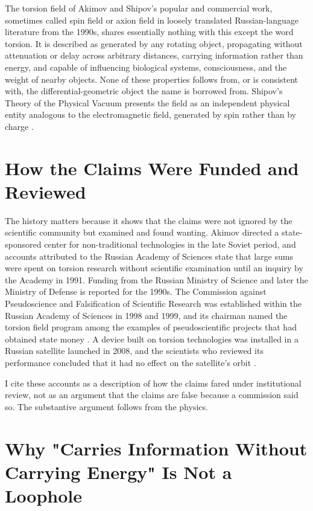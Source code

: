 \documentclass[11pt]{article}
\begin{document}
The torsion field of Akimov and Shipov's popular and commercial work, sometimes called spin field or axion field in loosely translated Russian-language literature from the 1990s, shares essentially nothing with this except the word torsion. It is described as generated by any rotating object, propagating without attenuation or delay across arbitrary distances, carrying information rather than energy, and capable of influencing biological systems, consciousness, and the weight of nearby objects. None of these properties follows from, or is consistent with, the differential-geometric object the name is borrowed from. Shipov's Theory of the Physical Vacuum presents the field as an independent physical entity analogous to the electromagnetic field, generated by spin rather than by charge \cite{AS}.

\section{How the Claims Were Funded and Reviewed}

The history matters because it shows that the claims were not ignored by the scientific community but examined and found wanting. Akimov directed a state-sponsored center for non-traditional technologies in the late Soviet period, and accounts attributed to the Russian Academy of Sciences state that large sums were spent on torsion research without scientific examination until an inquiry by the Academy in 1991. Funding from the Russian Ministry of Science and later the Ministry of Defense is reported for the 1990s. The Commission against Pseudoscience and Falsification of Scientific Research was established within the Russian Academy of Sciences in 1998 and 1999, and its chairman named the torsion field program among the examples of pseudoscientific projects that had obtained state money \cite{Kr2002}. A device built on torsion technologies was installed in a Russian satellite launched in 2008, and the scientists who reviewed its performance concluded that it had no effect on the satellite's orbit \cite{MT}.

I cite these accounts as a description of how the claims fared under institutional review, not as an argument that the claims are false because a commission said so. The substantive argument follows from the physics.

\section{Why "Carries Information Without Carrying Energy" Is Not a Loophole}
\end{document}
